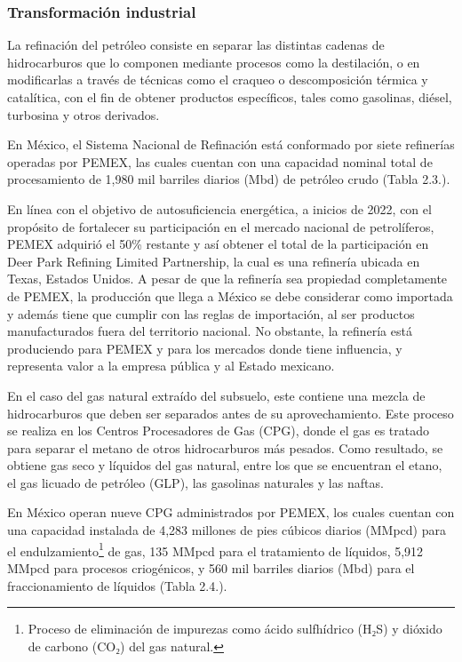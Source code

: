 \documentclass{sener2025}
\begin{document}
\subsubsection{Transformación industrial}

La refinación del petróleo consiste en separar las distintas cadenas de hidrocarburos que lo componen mediante procesos como la destilación, o en modificarlas a través de técnicas como el craqueo o descomposición térmica y catalítica, con el fin de obtener productos específicos, tales como gasolinas, diésel, turbosina y otros derivados.

En México, el Sistema Nacional de Refinación está conformado por siete refinerías operadas por PEMEX, las cuales cuentan con una capacidad nominal total de procesamiento de 1,980 mil barriles diarios (Mbd) de petróleo crudo (Tabla 2.3.).


En línea con el objetivo de autosuficiencia energética, a inicios de 2022, con el propósito de fortalecer su participación en el mercado nacional de petrolíferos, PEMEX adquirió el 50\% restante y así obtener el total de la participación en Deer Park Refining Limited Partnership, la cual es una refinería ubicada en Texas, Estados Unidos. A pesar de que la refinería sea propiedad completamente de PEMEX, la producción que llega a México se debe considerar como importada y además tiene que cumplir con las reglas de importación, al ser productos manufacturados fuera del territorio nacional. No obstante, la refinería está produciendo para PEMEX y para los mercados donde tiene influencia, y representa valor a la empresa pública y al Estado mexicano.

En el caso del gas natural extraído del subsuelo, este contiene una mezcla de hidrocarburos que deben ser separados antes de su aprovechamiento. Este proceso se realiza en los Centros Procesadores de Gas (CPG), donde el gas es tratado para separar el metano de otros hidrocarburos más pesados. Como resultado, se obtiene gas seco y líquidos del gas natural, entre los que se encuentran el etano, el gas licuado de petróleo (GLP), las gasolinas naturales y las naftas.

En México operan nueve CPG administrados por PEMEX, los cuales cuentan con una capacidad instalada de 4,283 millones de pies cúbicos diarios (MMpcd) para el endulzamiento\footnote{Proceso de eliminación de impurezas como ácido sulfhídrico (H₂S) y dióxido de carbono (CO₂) del gas natural.} de gas, 135 MMpcd para el tratamiento de líquidos, 5,912 MMpcd para procesos criogénicos, y 560 mil barriles diarios (Mbd) para el fraccionamiento de líquidos (Tabla 2.4.).
\end{document}
